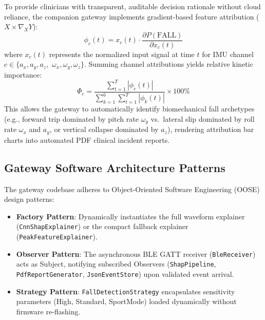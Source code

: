 To provide clinicians with transparent, auditable decision rationale without cloud reliance, the companion gateway implements gradient-based feature attribution (\(X \times \nabla_X Y\)):
\begin{equation}
    \phi_c(t) = x_c(t) \cdot \frac{\partial P(\text{FALL})}{\partial x_c(t)}
\end{equation}
where \(x_c(t)\) represents the normalized input signal at time \(t\) for IMU channel \(c \in \{a_x, a_y, a_z,\) \(\omega_x, \omega_y, \omega_z\}\). Summing channel attributions yields relative kinetic importance:
\begin{equation}
    \Phi_c = \frac{\sum_{t=1}^{T} |\phi_c(t)|}{\sum_{k=1}^{6} \sum_{t=1}^{T} |\phi_k(t)|} \times 100\%
\end{equation}
This allows the gateway to automatically identify biomechanical fall archetypes (e.g., forward trip dominated by pitch rate \(\omega_y\) vs.\ lateral slip dominated by roll rate \(\omega_x\) and \(a_y\), or vertical collapse dominated by \(a_z\)), rendering attribution bar charts into automated PDF clinical incident reports.

\subsection{Gateway Software Architecture Patterns}

The gateway codebase adheres to Object-Oriented Software Engineering (OOSE) design patterns:
\begin{itemize}
    \item \textbf{Factory Pattern}: Dynamically instantiates the full waveform explainer (\texttt{Cnn\-Shap\-Explainer}) or the compact fallback explainer (\texttt{Peak\-Feature\-Explainer}).
    \item \textbf{Observer Pattern}: The asynchronous BLE GATT receiver (\texttt{BleReceiver}) acts as Subject, notifying subscribed Observers (\texttt{ShapPipeline}, \texttt{PdfReportGenerator}, \texttt{JsonEventStore}) upon validated event arrival.
    \item \textbf{Strategy Pattern}: \texttt{FallDetectionStrategy} encapsulates sensitivity parameters (High, Standard, SportMode) loaded dynamically without firmware re-flashing.
\end{itemize}